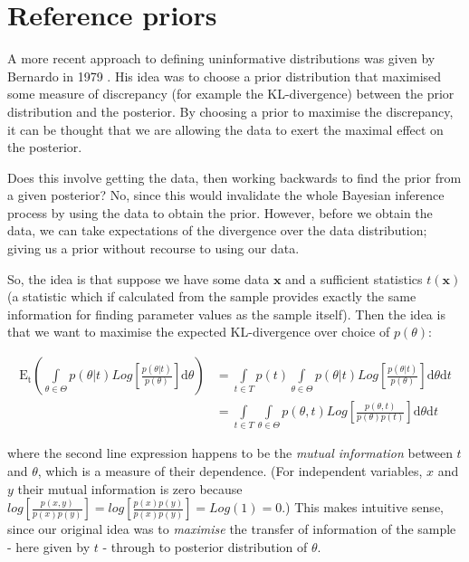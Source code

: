 \documentclass[11pt,fullpage]{book}
\begin{document}
\section{Reference priors}
A more recent approach to defining uninformative distributions was given by Bernardo in 1979 \cite{bernardo1979reference}. His idea was to choose a prior distribution that maximised some measure of discrepancy (for example the KL-divergence) between the prior distribution and the posterior. By choosing a prior to maximise the discrepancy, it can be thought that we are allowing the data to exert the maximal effect on the posterior. 

Does this involve getting the data, then working backwards to find the prior from a given posterior? No, since this would invalidate the whole Bayesian inference process by using the data to obtain the prior. However, before we obtain the data, we can take expectations of the divergence over the data distribution; giving us a prior without recourse to using our data. 

So, the idea is that suppose we have some data $\boldsymbol{x}$ and a sufficient statistics $t(\boldsymbol{x})$ (a statistic which if calculated from the sample provides exactly the same information for finding parameter values as the sample itself). Then the idea is that we want to maximise the expected KL-divergence over choice of $p(\theta)$:

\begin{align}
\mathrm{E_t}\left(\int\limits_{\theta\in\Theta} p(\theta|t) Log\left[\frac{p(\theta|t)}{p(\theta)}\right]\mathrm{d}\theta\right) &= \int\limits_{t\in T} p(t) \int\limits_{\theta\in\Theta} p(\theta|t) Log\left[\frac{p(\theta|t)}{p(\theta)}\right]\mathrm{d}\theta\mathrm{d}t\\
&= \int\limits_{t\in T} \int\limits_{\theta\in\Theta} p(\theta,t) Log\left[\frac{p(\theta,t)}{p(\theta)p(t)}\right]\mathrm{d}\theta\mathrm{d}t
\end{align}

where the second line expression happens to be the \textit{mutual information} between $t$ and $\theta$, which is a measure of their dependence. (For independent variables, $x$ and $y$ their mutual information is zero because $log\left[\frac{p(x,y)}{p(x)p(y)}\right] = log\left[\frac{p(x)p(y)}{p(x)p(y)}\right]=Log(1)=0$.) This makes intuitive sense, since our original idea was to \textit{maximise} the transfer of information of the sample - here given by $t$ - through to posterior distribution of $\theta$. 
\end{document}
